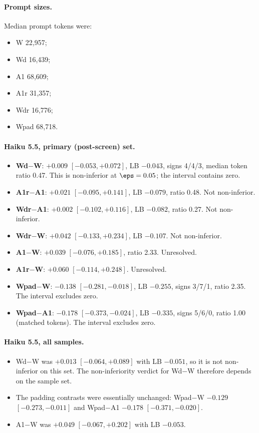 \paragraph{Prompt sizes.} Median prompt tokens were:
\begin{itemize}
\item W 22,957;
\item Wd 16,439;
\item A1 68,609;
\item A1r 31,357;
\item Wdr 16,776;
\item Wpad 68,718.
\end{itemize}

\paragraph{Haiku 5.5, primary (post-screen) set.}
\begin{itemize}
\item \textbf{Wd$-$W}: $+0.009$ $[-0.053, +0.072]$, LB $-0.043$, signs 4/4/3, median token ratio 0.47. This is non-inferior at $\eps = 0.05$; the interval contains zero.
\item \textbf{A1r$-$A1}: $+0.021$ $[-0.095, +0.141]$, LB $-0.079$, ratio 0.48. Not non-inferior.
\item \textbf{Wdr$-$A1}: $+0.002$ $[-0.102, +0.116]$, LB $-0.082$, ratio 0.27. Not non-inferior.
\item \textbf{Wdr$-$W}: $+0.042$ $[-0.133, +0.234]$, LB $-0.107$. Not non-inferior.
\item \textbf{A1$-$W}: $+0.039$ $[-0.076, +0.185]$, ratio 2.33. Unresolved.
\item \textbf{A1r$-$W}: $+0.060$ $[-0.114, +0.248]$. Unresolved.
\item \textbf{Wpad$-$W}: $-0.138$ $[-0.281, -0.018]$, LB $-0.255$, signs 3/7/1, ratio 2.35. The interval excludes zero.
\item \textbf{Wpad$-$A1}: $-0.178$ $[-0.373, -0.024]$, LB $-0.335$, signs 5/6/0, ratio 1.00 (matched tokens). The interval excludes zero.
\end{itemize}

\paragraph{Haiku 5.5, all samples.}
\begin{itemize}
\item Wd$-$W was $+0.013$ $[-0.064, +0.089]$ with LB $-0.051$, so it is not non-inferior on this set. The non-inferiority verdict for Wd$-$W therefore depends on the sample set.
\item The padding contrasts were essentially unchanged: Wpad$-$W $-0.129$ $[-0.273, -0.011]$ and Wpad$-$A1 $-0.178$ $[-0.371, -0.020]$.
\item A1$-$W was $+0.049$ $[-0.067, +0.202]$ with LB $-0.053$.
\end{itemize}

